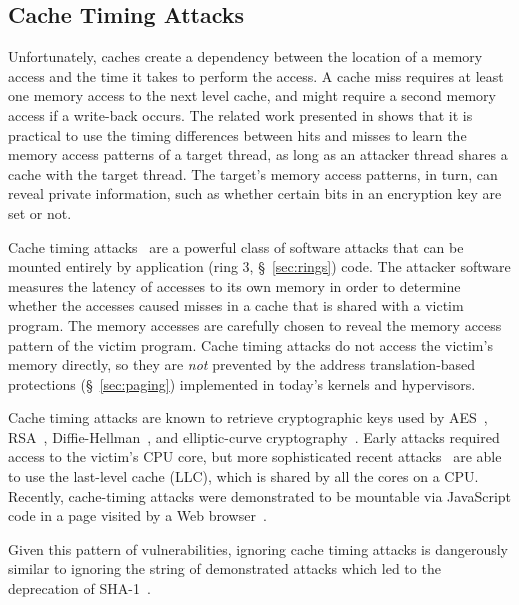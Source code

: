 \subsection{Cache Timing Attacks}
\label{sec:cache_timing}


Unfortunately, caches create a dependency between the location of a memory
access and the time it takes to perform the access. A cache miss requires
at least one memory access to the next level cache, and might require a second
memory access if a write-back occurs. The related work presented in
\cite{banescu2011cache} shows that it is practical to use the timing
differences between hits and misses to learn the memory access patterns of a
target thread, as long as an attacker thread shares a cache with the target
thread. The target's memory access patterns, in turn, can reveal private
information, such as whether certain bits in an encryption key are set or not.


Cache timing attacks~\cite{banescu2011cache} are a powerful class of software
attacks that can be mounted entirely by application
(ring 3, \S~\ref{sec:rings}) code. The attacker software measures the latency
of accesses to its own memory in order to determine whether the accesses caused
misses in a cache that is shared with a victim program. The memory accesses are
carefully chosen to reveal the memory access pattern of the victim program.
Cache timing attacks do not access the victim's memory directly, so they are
\emph{not} prevented by the address translation-based protections
(\S~\ref{sec:paging}) implemented in today's kernels and hypervisors.

Cache timing attacks are known to retrieve cryptographic keys used by
AES~\cite{bonneau2006aes}, RSA~\cite{brumley2005rsa},
Diffie-Hellman~\cite{kocher1996timing}, and elliptic-curve
cryptography~\cite{brumley2011ecc}.
Early attacks required access to the victim's CPU core, but more sophisticated
recent attacks~\cite{yarom2013llctiming, liu2015llctiming} are able to use the
last-level cache (LLC), which is shared by all the cores on a CPU. Recently,
cache-timing attacks were demonstrated to be mountable via JavaScript code in a
page visited by a Web browser~\cite{oren2015jstiming}.

Given this pattern of vulnerabilities, ignoring cache timing attacks is
dangerously similar to ignoring the string of demonstrated attacks which led to
the deprecation of SHA-1~\cite{nist2014sha1policy, google2014sha1deprecation,
microsoft2014sha1deprecation}.

